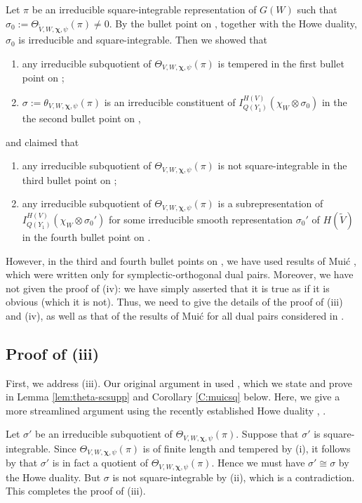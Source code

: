 \documentclass[11pt]{amsart}
\numberwithin{equation}{section}
\theoremstyle{plain}
\theoremstyle{definition}
\theoremstyle{remark}
\def\Chi{\boldsymbol{\chi}}
\begin{document}
Let $\pi$ be an irreducible square-integrable representation of $G(W)$ such that $\sigma_0 := \Theta_{\tilde{V},W,\Chi,\psi}(\pi) \ne 0$.
By the bullet point on \cite[p.~645]{gi}, together with the Howe duality, $\sigma_0$ is irreducible and square-integrable.
Then we showed that
\begin{enumerate}
 \item any irreducible subquotient of $\Theta_{V,W,\Chi,\psi}(\pi)$ is tempered in the first bullet point on \cite[p.~646]{gi};
 \item $\sigma := \theta_{V,W,\Chi,\psi}(\pi)$ is an irreducible constituent of $I^{H(V)}_{Q(Y_1)}(\chi_W \otimes \sigma_0)$ in the the second bullet point on \cite[p.~646]{gi},
\end{enumerate}
and claimed that
\begin{enumerate}[resume]
\item any irreducible subquotient of $\Theta_{V,W,\Chi,\psi}(\pi)$ is not square-integrable in the third bullet point on \cite[p.~646]{gi};
\item any irreducible subquotient of $\Theta_{V,W,\Chi,\psi}(\pi)$ is a subrepresentation of $I^{H(V)}_{Q(Y_1)}(\chi_W \otimes \sigma_0')$ for some irreducible smooth representation $\sigma_0'$ of $H(\tilde{V})$ in the fourth bullet point on \cite[p.~646]{gi}.
\end{enumerate}
However, in the third and fourth bullet points on \cite[p.~646]{gi}, we have used results of Mui\'c \cite[Lemma 4.2 and Theorem 5.1(i)]{muic}, which were written only for symplectic-orthogonal dual pairs.
Moreover, we have not given the proof of (iv): we have simply asserted that it is true as if it is obvious (which it is not).
Thus, we need to give the details of the proof of (iii) and (iv), as well as that of the results of Mui\'c for all dual pairs considered in \cite{gi}.

\subsection{Proof of (iii)}

First, we address (iii).
Our original argument in \cite{gi} used \cite[Lemma 4.2 and Theorem 5.1(i)]{muic}, which we state and prove in Lemma \ref{lem:theta-scsupp} and Corollary \ref{C:muicsq} below.
Here, we give a more streamlined argument using the recently established Howe duality \cite{gt1}, \cite{gt2}.

Let $\sigma'$ be an irreducible subquotient of $\Theta_{V,W,\Chi,\psi}(\pi)$.
Suppose that $\sigma'$ is square-integrable.
Since $\Theta_{V,W,\Chi,\psi}(\pi)$ is of finite length and tempered by (i), it follows by \cite[Corollaire III.7.2]{w0} that $\sigma'$ is in fact a quotient of $\Theta_{V,W,\Chi,\psi}(\pi)$.
Hence we must have $\sigma' \cong \sigma$ by the Howe duality.
But $\sigma$ is not square-integrable by (ii), which is a contradiction.
This completes the proof of (iii).
\end{document}
